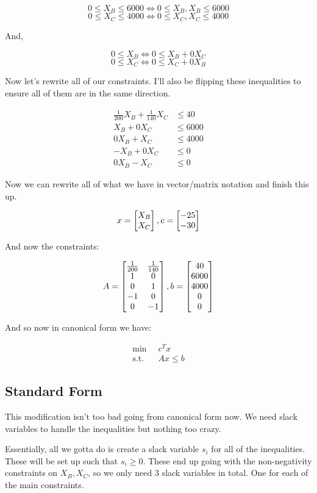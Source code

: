\[0 \leq X_B \leq 6000 \iff 0 \leq X_B, X_B \leq 6000\]
\[0 \leq X_C \leq 4000 \iff 0 \leq X_C, X_C \leq 4000\]

And, 

\[0 \leq X_B \iff 0 \leq X_B + 0X_C\]
\[0 \leq X_C \iff 0 \leq X_C + 0X_B\]

Now let's rewrite all of our constraints. I'll also be flipping these inequalities to ensure all of them are in the same direction.

\begin{align*}
	\frac{1}{200} X_B + \frac{1}{140}X_C &\leq 40 \\
	X_B + 0X_C &\leq 6000 \\
	0X_B + X_C &\leq 4000 \\
	-X_B + 0X_C &\leq 0 \\
	0X_B - X_C &\leq 0
\end{align*}

Now we can rewrite all of what we have in vector/matrix notation and finish this up.

\[
	x = \m{b}{X_B \\ X_C}, c = \m{b}{-25 \\ -30}
\]

And now the constraints:

\[
	A = \m{b}{\frac{1}{200} & \frac{1}{140} \\ 1 & 0 \\ 0 & 1 \\ -1 & 0 \\ 0 & -1}, b = \m{b}{40 \\ 6000 \\ 4000 \\ 0 \\ 0}
\]

And so now in canonical form we have:


\begin{align*}
	\min \;\; & c^T x \\
	\text{s.t.} \;\; & Ax \leq b
\end{align*}

\subsection*{Standard Form}

This modification isn't too bad going from canonical form now. We need slack variables to handle the inequalities but nothing too crazy. 

Essentially, all we gotta do is create a slack variable $s_i$ for all of the inequalities. These will be set up such that $s_i \geq 0$. These end up going with the non-negativity constraints on $X_B, X_C$, so we only need 3 slack variables in total. One for each of the main constraints.  

